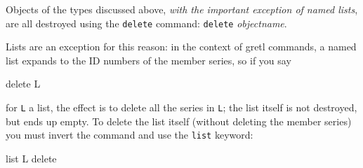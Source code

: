 Objects of the types discussed above, \textit{with the important
  exception of named lists}, are all destroyed using the
\texttt{delete} command: \texttt{delete} \textsl{objectname}.

Lists are an exception for this reason: in the context of gretl
commands, a named list expands to the ID numbers of the member series,
so if you say

\begin{code}
delete L
\end{code} 

for \texttt{L} a list, the effect is to delete all the series in
\texttt{L}; the list itself is not destroyed, but ends up empty.  To
delete the list itself (without deleting the member series) you must
invert the command and use the \texttt{list} keyword:

\begin{code}
list L delete
\end{code} 
